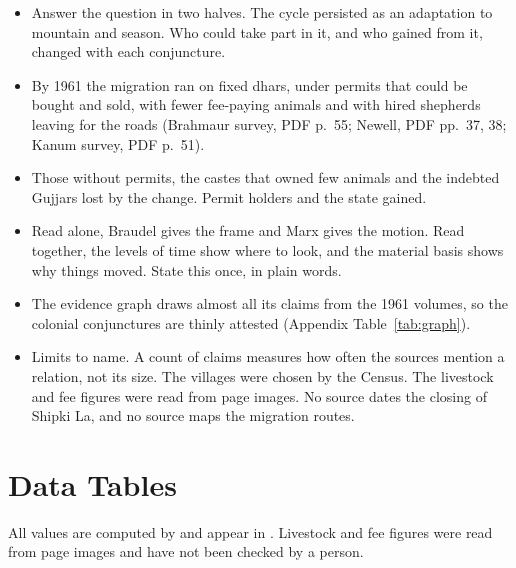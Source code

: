 \documentclass[11pt,a4paper]{article}
\newcommand{\cit}[1]{{\small(#1)}}
\begin{document}
\begin{itemize}
\item Answer the question in two halves. The cycle persisted as an adaptation
  to mountain and season. Who could take part in it, and who gained from it,
  changed with each conjuncture.
\item By 1961 the migration ran on fixed dhars, under permits that could be
  bought and sold, with fewer fee-paying animals and with hired shepherds
  leaving for the roads \cit{Brahmaur survey, PDF p.~55; Newell, PDF pp.~37,
  38; Kanum survey, PDF p.~51}.
\item Those without permits, the castes that owned few animals and the indebted
  Gujjars lost by the change. Permit holders and the state gained.
\item Read alone, Braudel gives the frame and Marx gives the motion. Read
  together, the levels of time show where to look, and the material basis shows
  why things moved. State this once, in plain words.
\item The evidence graph draws almost all its claims from the 1961 volumes, so
  the colonial conjunctures are thinly attested \cit{Appendix
  Table~\ref{tab:graph}}.
\item Limits to name. A count of claims measures how often the sources mention a
  relation, not its size. The villages were chosen by the Census. The livestock
  and fee figures were read from page images. No source dates the closing of
  Shipki La, and no source maps the migration routes.
\end{itemize}

\appendix
\section{Data Tables}\label{app:data}

\noindent All values are computed by  and
appear in . Livestock and fee figures were
read from page images and have not been checked by a person.
\end{document}
